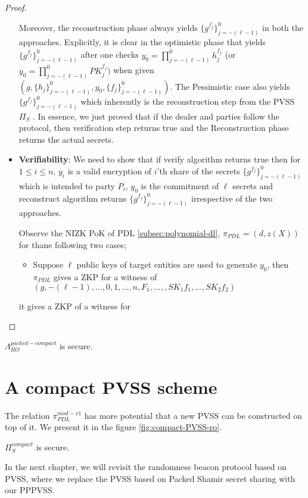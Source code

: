 \begin{proof}
\begin{itemize}
      Moreover, the reconstruction phase always yields $\{g^{f_j}\}_{j=-(\ell-1)}^0$ in both the approaches. Explicitly, it is 
      clear in the optimistic phase that yields $\{g^{f_j}\}_{j=-(\ell-1)}^0$ after one checks $y_0=\prod_{j=-(\ell-1)}^{0}h_j^{f_j}$ (or $y_0=\prod_{j=-(\ell-1)}^0PK_j^{f_j})$ 
      when given $(g,\{h_j\}_{j=-(\ell-1)}^0,y_0,\{f_j\}_{j=-(\ell-1)}^0)$. The Pessimistic case also yields 
      $\{g^{f_j}\}_{j=-(\ell-1)}^0$ which inherently is the reconstruction step from the PVSS $\Pi_S$ \cite{cryptoeprint:2023/1669}. 
      In essence, we just proved that if the dealer and parties follow the protocol, then verification step returns 
      true and the Reconstruction phase returns the actual secrets.
    \item \textbf{Verifiability}: We need to show that if verify algorithm returns true then for $1\leq i\leq n$, 
      $y_i$ is a valid encryption of $i$'th share of the secrets $\{g^{f_j}\}_{j=-(\ell-1)}^0$ which is intended to party $P_i$, $y_0$ 
      is the commitment of $\ell$ secrets and reconstruct algorithm returns $\{g^{f_j}\}_{j=-(\ell-1)}^0$ irrespective of 
      the two approaches.\par

      Observe the NIZK PoK of PDL \ref{subsec:polynomial-dl}, $\pi_{PDL}=(d,z(X))$ for thane following two cases;
      \begin{itemize}
        \item Suppose $\ell$ public keys of target entities are used to generate $y_0$, then $\pi_{PDL}$ gives a ZKP 
          for a witness of $(g,-(\ell-1),\dots,0,1,\dots,n,F_1,\dots,,SK_1f_1,\dots,SK_2f_2)$
      \end{itemize}
      it gives a ZKP of a witness for 
      
  \end{itemize}
\end{proof}
 
\begin{theorem}
  $\Lambda_{RO}^{packed-compact}$ is secure.
\end{theorem}

\section{A compact PVSS scheme}
The relation $\pi_{PDL}^{mod-v1}$ has more potential that a new PVSS can be constructed on top of it. We 
present it in the figure \ref{fig:compact-PVSS-ro}. 



\begin{theorem}
  $\Pi_{S}^{compact}$ is secure.
\end{theorem}

In the next chapter, we will revisit the randomness beacon \cite{cryptoeprint:2020/644} protocol based on PVSS, 
where we replace the PVSS based on Packed Shamir secret sharing with our PPPVSS. 

